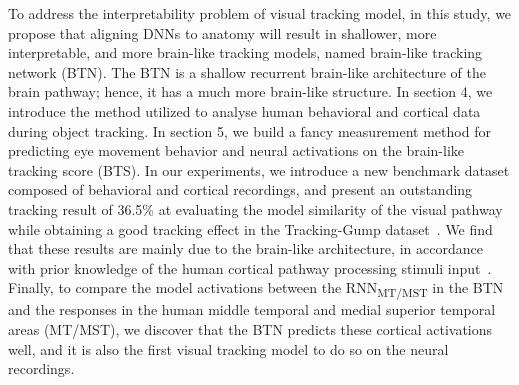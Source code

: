 \documentclass[final,3p,times,twocolumn]{elsarticle}
\begin{document}
To address the interpretability problem of visual tracking model, in this study, we propose that aligning DNNs to anatomy will result in shallower, more interpretable, and more brain-like tracking models, named brain-like tracking network (BTN).
The BTN is a shallow recurrent brain-like architecture of the brain pathway; 
hence, it has a much more brain-like structure. 
In section 4, we introduce the method utilized to analyse human behavioral and cortical data during object tracking. 
In section 5, we build a fancy measurement method for predicting eye movement behavior and neural activations on the brain-like tracking score (BTS). 
In our experiments, we introduce a new benchmark dataset composed of behavioral and cortical recordings, 
and present an outstanding tracking result of 36.5\% at evaluating the model similarity of the visual pathway while obtaining a good tracking effect in the Tracking-Gump dataset~\cite{gaze_forrest}. 
We find that these results are mainly due to the brain-like architecture, in accordance with prior knowledge of the human cortical pathway processing stimuli input~\cite{TangSchrimpfLotter2018Recurrent, yin2020deep, kar2019evidence}. 
Finally, to compare the model activations between the RNN\textsubscript{MT/MST} in the BTN and the responses in the human middle temporal and medial superior temporal areas (MT/MST), we discover that the BTN predicts these cortical activations well, 
and it is also the first visual tracking model to do so on the neural recordings. 

\end{document}
